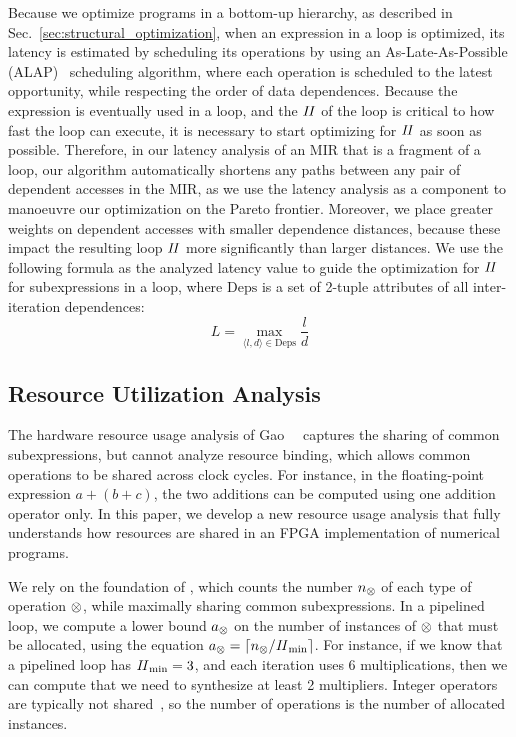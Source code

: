 Because we optimize programs in a bottom-up hierarchy, as described in
Sec.~\ref{sec:structural_optimization}, when an expression in a loop is
optimized, its latency is estimated by scheduling its operations by using an
As-Late-As-Possible (ALAP)~\cite{wang_hls} scheduling algorithm, where each
operation is scheduled to the latest opportunity, while respecting the order of
data dependences.  Because the expression is eventually used in a loop, and the
$\mathit{II}$ of the loop is critical to how fast the loop can execute, it is necessary
to start optimizing for $\mathit{II}$ as soon as possible. Therefore, in our latency
analysis of an MIR that is a fragment of a loop, our algorithm automatically
shortens any paths between any pair of dependent accesses in the MIR\@, as we
use the latency analysis as a component to manoeuvre our optimization on the
Pareto frontier.  Moreover, we place greater weights on dependent accesses with
smaller dependence distances, because these impact the resulting loop $\mathit{II}$
more significantly than larger distances.  We use the following formula as the
analyzed latency value to guide the optimization for $\mathit{II}$ for subexpressions
in a loop, where $\mathrm{Deps}$ is a set of 2-tuple attributes of all
inter-iteration dependences:
\begin{equation}
    L = \max_{\langle l, d \rangle \in \mathrm{Deps}} \frac{l}{d}
\end{equation}

\subsection{Resource Utilization Analysis}
\label{sub:resource_utilization_analysis}

The hardware resource usage analysis of Gao~\etal~\cite{soap2} captures the
sharing of common subexpressions, but cannot analyze resource binding, which
allows common operations to be shared across clock cycles. For instance, in
the floating-point expression $a + (b + c)$, the two additions can be computed
using one addition operator only. In this paper, we develop a new resource
usage analysis that fully understands how resources are shared in an FPGA
implementation of numerical programs.

We rely on the foundation of \SOAP{}, which counts the number $n_\otimes$
of each type of operation $\otimes$, while maximally sharing common
subexpressions.  In a pipelined loop, we compute a lower bound $a_\otimes$
on the number of instances of $\otimes$ that must be allocated, using
the equation $a_\otimes = \lceil n_\otimes/\mathit{II}_{\rm min}\rceil$.  For instance,
if we know that a pipelined loop has $\mathit{II}_{\rm min} = 3$, and each iteration uses 6
multiplications, then we can compute that we need to synthesize at least 2
multipliers.  Integer operators are typically not shared~\cite{cong15}, so the
number of operations is the number of allocated instances.

